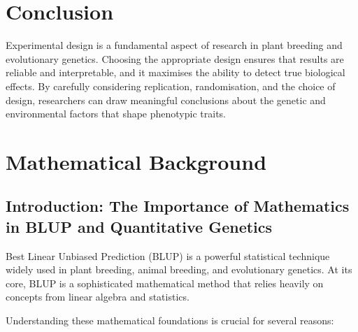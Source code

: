 \documentclass[12pt,a4paper]{article}
\begin{document}
\section{Conclusion}

Experimental design is a fundamental aspect of research in plant breeding and evolutionary genetics. Choosing the appropriate design ensures that results are reliable and interpretable, and it maximises the ability to detect true biological effects. By carefully considering replication, randomisation, and the choice of design, researchers can draw meaningful conclusions about the genetic and environmental factors that shape phenotypic traits.

\section{Mathematical Background}

\subsection{Introduction: The Importance of Mathematics in BLUP and Quantitative Genetics}

Best Linear Unbiased Prediction (BLUP) is a powerful statistical technique widely used in plant breeding, animal breeding, and evolutionary genetics. At its core, BLUP is a sophisticated mathematical method that relies heavily on concepts from linear algebra and statistics. 

Understanding these mathematical foundations is crucial for several reasons:
\end{document}
